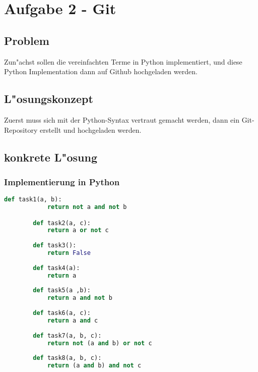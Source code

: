 \documentclass[a4paper,11pt,titlepage]{article}
\begin{document}
    \section{Aufgabe 2 - Git}

    \subsection{Problem}
    Zun"achst sollen die vereinfachten Terme in Python implementiert, und diese Python Implementation dann auf Github hochgeladen werden.

    \subsection{L"osungskonzept}
    Zuerst muss sich mit der Python-Syntax vertraut gemacht werden, dann ein Git-Repository erstellt und hochgeladen werden.

    \subsection{konkrete L"osung}

    \subsubsection{Implementierung in Python}
    \begin{lstlisting}[language=Python]
        def task1(a, b):
            return not a and not b

        def task2(a, c):
            return a or not c
        
        def task3():
            return False
        
        def task4(a):
            return a
        
        def task5(a ,b):
            return a and not b
        
        def task6(a, c):
            return a and c
        
        def task7(a, b, c):
            return not (a and b) or not c
        
        def task8(a, b, c):
            return (a and b) and not c
    \end{lstlisting}
\end{document}
